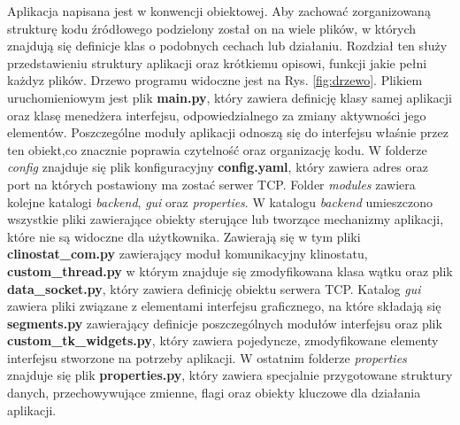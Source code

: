 Aplikacja napisana jest w konwencji obiektowej. Aby zachować zorganizowaną strukturę kodu źródłowego podzielony został on na wiele plików, w których znajdują się definicje klas o podobnych cechach lub działaniu. Rozdział ten służy przedstawieniu struktury aplikacji oraz krótkiemu opisowi, funkcji jakie pełni każdy\linebreak z plików. Drzewo programu widoczne jest na Rys. \ref{fig:drzewo}. Plikiem uruchomieniowym jest plik \textbf{main.py}, który zawiera definicję klasy samej aplikacji oraz klasę menedżera interfejsu, odpowiedzialnego za zmiany aktywności jego elementów. Poszczególne moduły aplikacji odnoszą się do interfejsu właśnie przez ten obiekt,\linebreak co znacznie poprawia czytelność oraz organizację kodu. W folderze \textit{config} znajduje się plik konfiguracyjny \textbf{config.yaml}, który zawiera adres oraz port na których postawiony ma zostać serwer TCP. Folder \textit{modules} zawiera kolejne katalogi \textit{backend}, \textit{gui} oraz \textit{properties}. W katalogu \textit{backend} umieszczono wszystkie pliki zawierające obiekty sterujące lub tworzące mechanizmy aplikacji, które nie są widoczne dla użytkownika. Zawierają się w tym pliki \textbf{clinostat\_com.py} zawierający moduł komunikacyjny klinostatu, \textbf{custom\_thread.py} w którym znajduje się zmodyfikowana klasa wątku oraz plik \textbf{data\_socket.py}, który zawiera definicję obiektu serwera TCP. Katalog \textit{gui} zawiera pliki związane z elementami interfejsu graficznego, na które składają się \textbf{segments.py} zawierający definicje poszczególnych modułów interfejsu oraz plik \textbf{custom\_tk\_widgets.py}, który zawiera pojedyncze, zmodyfikowane elementy interfejsu stworzone na potrzeby aplikacji. W ostatnim folderze \textit{properties} znajduje się plik \textbf{properties.py}, który zawiera specjalnie przygotowane struktury danych, przechowywujące zmienne, flagi oraz obiekty kluczowe dla działania aplikacji.

